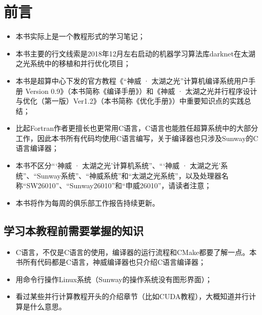 \maketitle%
\MAKETITLE%
\intobmk\chapter*{前\quad 言}%
\setcounter{page}{1}%
\begin{itemize}
    \item 本书实际上是一个教程形式的学习笔记；
    \item 本书主要的行文线索是2018年12月左右启动的机器学习算法库darknet在太湖之光系统中的移植和并行优化项目；
    \item 本书是超算中心下发的官方教程《“神威 · 太湖之光”计算机编译系统用户手册 Version 0.9》（本书简称《编译手册》）和《神威 · 太湖之光并行程序设计与优化（第一版）Ver1.2》（本书简称《优化手册》）中重要知识点的实践总结；
    \item 比起Fortran作者更擅长也更常用C语言，C语言也能胜任超算系统中的大部分工作，因此本书所有代码均使用C语言编写，关于编译器也只涉及Sunway的C语言编译器；
    \item 本书不区分“‘神威 · 太湖之光’计算机系统”、“‘神威 · 太湖之光’系统”、“Sunway系统”、“神威系统”和“太湖之光系统”，以及处理器名称“SW26010”、“Sunway26010”和“申威26010”，请读者注意；
    \item 本书将作为每周的俱乐部工作报告持续更新。
\end{itemize}

\section*{学习本教程前需要掌握的知识}
\begin{itemize}
    \item C语言，不仅是C语言的使用，编译器的运行流程和CMake都要了解一点。本书所有代码都是C语言，神威编译器也只介绍C语言编译器；
    \item 用命令行操作Linux系统（Sunway的操作系统没有图形界面）；
    \item 看过某些并行计算教程开头的介绍章节（比如CUDA教程），大概知道并行计算是什么意思。
\end{itemize}

